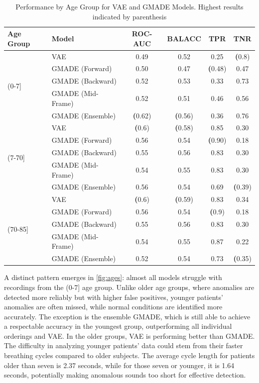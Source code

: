\begin{table}[h!]
    \centering
    \caption{Performance by Age Group for VAE and GMADE Models. Highest results indicated by parenthesis}
    \begin{tabular}{|l|l|c|c|c|c|}
    \hline
    \textbf{Age Group} & \textbf{Model} & \textbf{ROC-AUC} & \textbf{BALACC} & \textbf{TPR} & \textbf{TNR} \\
    \hline
    \multirow{5}{*}{(0-7]} 
    & VAE & 0.49 & 0.52 & 0.25 & \textbf(0.8) \\
    & GMADE (Forward) & 0.50 & 0.47 & \textbf(0.48) & 0.47 \\
    & GMADE (Backward) & 0.52 & 0.53 & 0.33 & 0.73 \\
    & GMADE (Mid-Frame) & 0.52 & 0.51 & 0.46 & 0.56 \\
    & GMADE (Ensemble) & \textbf(0.62) & \textbf(0.56) & 0.36 & 0.76 \\
    \hline
    \multirow{5}{*}{(7-70]} 
    & VAE & \textbf(0.6) & \textbf(0.58) & 0.85 & 0.30 \\
    & GMADE (Forward) & 0.56 & 0.54 & \textbf(0.90) & 0.18 \\
    & GMADE (Backward) & 0.55 & 0.56 & 0.83 & 0.30 \\
    & GMADE (Mid-Frame) & 0.54 & 0.55 & 0.83 & 0.30 \\
    & GMADE (Ensemble) & 0.56 & 0.54 & 0.69 & \textbf(0.39) \\
    \hline
    \multirow{5}{*}{(70-85]} 
    & VAE & \textbf(0.6) & \textbf(0.59) & 0.83 & 0.34 \\
    & GMADE (Forward) & 0.56 & 0.54 & \textbf(0.9) & 0.18 \\
    & GMADE (Backward) & 0.55 & 0.56 & 0.83 & 0.30 \\
    & GMADE (Mid-Frame) & 0.54 & 0.55 & 0.87 & 0.22 \\
    & GMADE (Ensemble) & 0.52 & 0.54 & 0.73 & \textbf(0.35) \\
    \hline
    \end{tabular}
    \label{fig:ages}
\end{table}

A distinct pattern emerges in \autoref{fig:ages}: almost all models struggle with recordings from the (0-7] age group. Unlike older age groups, where anomalies are detected more reliably but with higher false positives, younger patients' anomalies are often missed, while normal conditions are identified more accurately. The exception is the ensemble GMADE, which is still able to achieve a respectable accuracy in the youngest group, outperforming all individual orderings and VAE. In the older groups, VAE is performing better than GMADE.\\
The difficulty in analyzing younger patients' data could stem from their faster breathing cycles compared to older subjects. The average cycle length for patients older than seven is 2.37 seconds, while for those seven or younger, it is 1.64 seconds, potentially making anomalous sounds too short for effective detection.

